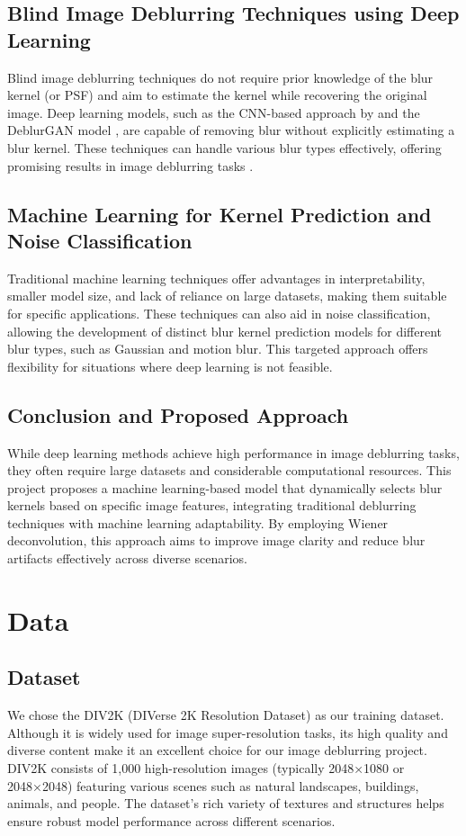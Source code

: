 \documentclass[twoside,11pt]{article}
\begin{document}
\subsection{Blind Image Deblurring Techniques using Deep Learning}
Blind image deblurring techniques do not require prior knowledge of the blur kernel (or PSF) and aim to estimate the kernel while recovering the original image. Deep learning models, such as the CNN-based approach by \citet{nah2016multi} and the DeblurGAN model \citep{kupyn2018deblurgan}, are capable of removing blur without explicitly estimating a blur kernel. These techniques can handle various blur types effectively, offering promising results in image deblurring tasks \citep{amrollahi2023survey}.

\subsection{Machine Learning for Kernel Prediction and Noise Classification}
Traditional machine learning techniques offer advantages in interpretability, smaller model size, and lack of reliance on large datasets, making them suitable for specific applications. These techniques can also aid in noise classification, allowing the development of distinct blur kernel prediction models for different blur types, such as Gaussian and motion blur. This targeted approach offers flexibility for situations where deep learning is not feasible.

\subsection{Conclusion and Proposed Approach}
While deep learning methods achieve high performance in image deblurring tasks, they often require large datasets and considerable computational resources. This project proposes a machine learning-based model that dynamically selects blur kernels based on specific image features, integrating traditional deblurring techniques with machine learning adaptability. By employing Wiener deconvolution, this approach aims to improve image clarity and reduce blur artifacts effectively across diverse scenarios.


\section{Data}

\subsection{Dataset}
We chose the DIV2K (DIVerse 2K Resolution Dataset) as our training dataset. Although it is widely used for image super-resolution tasks, its high quality and diverse content make it an excellent choice for our image deblurring project. DIV2K consists of 1,000 high-resolution images (typically 2048×1080 or 2048×2048) featuring various scenes such as natural landscapes, buildings, animals, and people. The dataset’s rich variety of textures and structures helps ensure robust model performance across different scenarios.
\end{document}

